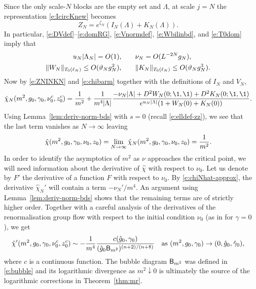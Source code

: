 Since the only scale-$N$ blocks are the empty set and $\Lambda$, at scale $j = N$
the representation \eqref{e:IcircKnew} becomes
\begin{equation}
\label{e:ZNINKN}
Z_N = e^{\zeta_N} (I_N(\Lambda) + K_N(\Lambda)).
\end{equation}
In particular, \eqref{e:DVdef}--\eqref{e:domRG},
\eqref{e:Vnormdef}, \eqref{e:Wbilinbd}, and \eqref{e:T0dom} imply that
\begin{align}
\label{e:unu-bd}
u_N |\Lambda_N| = O(1),
	&\qquad
\nu_N = O(L^{-2 N} g_N),
	\\
\label{e:WKbd}
\|W_N\|_{T_0(\ell_N)} \le O(\vartheta_N g_N^2),
	&\qquad
\|K_N\|_{T_0(\ell_N)} \le O(\vartheta_N g_N^3).
\end{align}
Now by \eqref{e:ZNINKN} and \eqref{e:chibarm} together with the definitions of
$I_N$ and $V_N$,
\begin{equation}
\label{e:chiNhat-approx}
\hat\chi_N(m^2, \gcc_0, \gamma_0, \nu_0^c, z_0^c)
	=
\frac{1}{m^2}
	+
\frac{1}{m^4 |\Lambda|}
\frac
{-\nu_N |\Lambda| + D^2 W_N(0; \1, \1) + D^2 K_N(0; \1, \1)}
{e^{u_N |\Lambda|} (1 + W_N(0) + K_N(0))}.
\end{equation}
Using Lemma~\ref{lem:deriv-norm-bds} with $s = 0$ (recall \eqref{e:elldef-zz}),
we see that the last term vanishes as $N\to\infty$ leaving
\begin{equation}
\label{e:chi-m-hat}
\hat\chi(m^2, g_0, \gamma_0, \nu_0, z_0)
	=
\lim_{N\rightarrow\infty} \hat\chi_N(m^2, g_0, \gamma_0, \nu_0, z_0)
	=
\frac{1}{m^2}.
\end{equation}
In order to identify the asymptotics of $m^2$ as $\nu$ approaches the
critical point, we will need information about the derivative of $\hat\chi$ with
respect to $\nu_0$. Let us denote by $F'$ the derivative of a function $F$ with
respect to $\nu_0$. By \eqref{e:chiNhat-approx}, the derivative $\hat\chi_N'$
will contain a term $-\nu_N'/m^4$. An argument using Lemma~\ref{lem:deriv-norm-bds}
shows that the remaining terms are of strictly higher order. Together with a careful
analysis of the derivatives of the renormalisation group flow with respect to the initial
condition $\nu_0$ (as in \cite[Section~\ref{log-sec:pfmr}]{BBS-saw4-log} for $\gamma = 0$),
we get
\begin{equation}
\label{e:chiprime-m-hat}
\hat\chi'(m^2, g_0, \gamma_0, \nu_0^c, z_0^c)
	\sim
-\frac{1}{m^4} \frac{c(\hat{g}_0, \gamma_0)}{(\hat{g}_0{\sf B}_{m^2})^{(n+2)/(n+8)}}
	\quad
\text{as $(m^2,g_0,\gamma_0) \rightarrow (0,\hat{g}_0,\hat\gamma_0)$},
\end{equation}
where $c$ is a continuous function. The bubble diagram ${\sf B}_{m^2}$ was defined
in \eqref{e:bubble} and its logarithmic divergence as $m^2\downarrow0$ is ultimately
the source of the logarithmic corrections in Theorem~\ref{thm:mr}.

